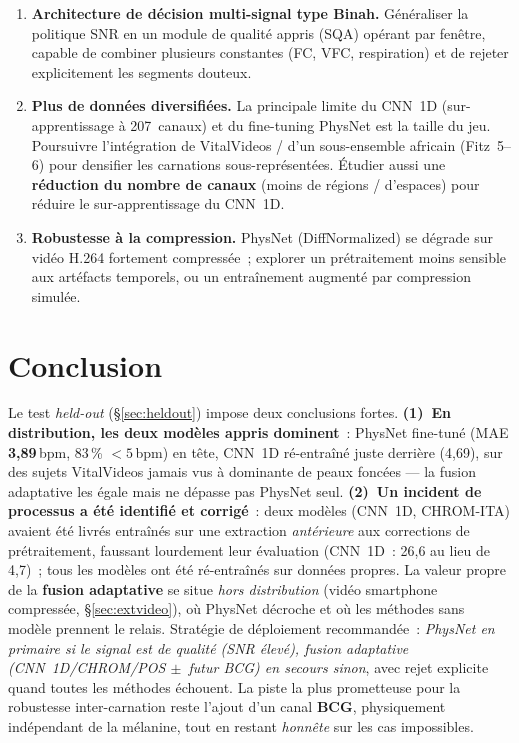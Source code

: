 \documentclass[11pt,a4paper]{article}
\begin{document}
\begin{enumerate}[leftmargin=1.5em]
\item \textbf{Architecture de décision multi-signal type Binah.} Généraliser la
politique SNR en un module de qualité appris (SQA) opérant par fenêtre, capable de
combiner plusieurs constantes (FC, VFC, respiration) et de rejeter explicitement
les segments douteux.

\item \textbf{Plus de données diversifiées.} La principale limite du CNN~1D
(sur-apprentissage à 207~canaux) et du fine-tuning PhysNet est la taille du jeu.
Poursuivre l'intégration de VitalVideos / d'un sous-ensemble africain (Fitz~5--6)
pour densifier les carnations sous-représentées. Étudier aussi une
\textbf{réduction du nombre de canaux} (moins de régions / d'espaces) pour
réduire le sur-apprentissage du CNN~1D.

\item \textbf{Robustesse à la compression.} PhysNet (DiffNormalized) se dégrade
sur vidéo H.264 fortement compressée~; explorer un prétraitement moins sensible
aux artéfacts temporels, ou un entraînement augmenté par compression simulée.

\end{enumerate}

\section{Conclusion}

Le test \emph{held-out} (§\ref{sec:heldout}) impose deux conclusions fortes.
\textbf{(1)~En distribution, les deux modèles appris dominent}~: PhysNet fine-tuné
(MAE \textbf{3,89}\,bpm, 83\,\% $<5$\,bpm) en tête, CNN~1D ré-entraîné juste derrière
(4,69), sur des sujets VitalVideos jamais vus à dominante de peaux foncées --- la
fusion adaptative les égale mais ne dépasse pas PhysNet seul.
\textbf{(2)~Un incident de processus a été identifié et corrigé}~: deux modèles
(CNN~1D, CHROM-ITA) avaient été livrés entraînés sur une extraction \emph{antérieure}
aux corrections de prétraitement, faussant lourdement leur évaluation
(CNN~1D~: 26,6 au lieu de 4,7)~; tous les modèles ont été ré-entraînés sur données
propres. La valeur propre de la \textbf{fusion adaptative} se situe \emph{hors
distribution} (vidéo smartphone compressée, §\ref{sec:extvideo}), où PhysNet décroche
et où les méthodes sans modèle prennent le relais. Stratégie de déploiement
recommandée~: \emph{PhysNet en primaire si le signal est de qualité (SNR élevé),
fusion adaptative (CNN~1D/CHROM/POS $\pm$~futur BCG) en secours sinon}, avec rejet
explicite quand toutes les méthodes échouent. La piste la plus prometteuse pour la
robustesse inter-carnation reste l'ajout d'un canal \textbf{BCG}, physiquement
indépendant de la mélanine, tout en restant \emph{honnête} sur les cas impossibles.
\end{document}
